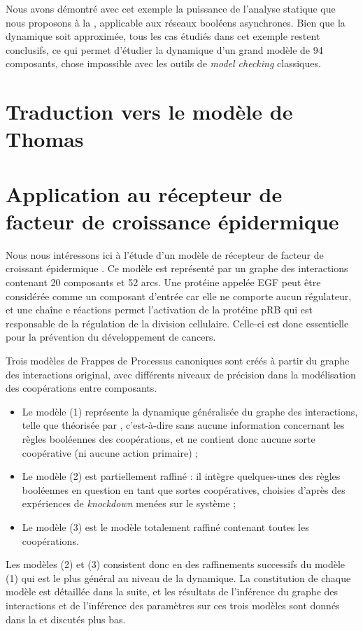 \myskip

Nous avons démontré avec cet exemple la puissance de l'analyse statique que nous proposons
à la , applicable aux réseaux booléens asynchrones.
Bien que la dynamique soit approximée, tous les cas étudiés dans cet exemple restent conclusifs,
ce qui permet d'étudier la dynamique d'un grand modèle de 94 composants,
chose impossible avec les outils de \textit{model checking} classiques.



\section{Traduction vers le modèle de Thomas}


\section{Application au récepteur de facteur de croissance épidermique}

Nous nous intéressons ici à l'étude d'un modèle de récepteur de facteur de croissant épidermique
\cite{Sahin09}.
Ce modèle est représenté par un graphe des interactions contenant 20 composants et 52 arcs.
Une protéine appelée EGF peut être considérée comme un composant d'entrée
car elle ne comporte aucun régulateur,
et une chaîne e réactions permet l'activation de la protéine pRB qui est responsable
de la régulation de la division cellulaire.
Celle-ci est donc essentielle pour la prévention du développement de cancers.

Trois modèles de Frappes de Processus canoniques
sont créés à partir du graphe des interactions original, avec différents niveaux
de précision dans la modélisation des coopérations entre composants.
\begin{itemize}
  \item Le modèle (1) représente la dynamique généralisée du graphe des interactions,
    telle que théorisée par ,
    c'est-à-dire sans aucune information concernant les règles booléennes des coopérations,
    et ne contient donc aucune sorte coopérative (ni aucune action primaire) ;
  \item Le modèle (2) est partiellement raffiné : il intègre quelques-unes des règles
    booléennes en question en tant que sortes coopératives,
    choisies d'après des expériences de \textit{knockdown} menées sur le système ;
  \item Le modèle (3) est le modèle totalement raffiné contenant toutes les coopérations.
\end{itemize}
Les modèles (2) et (3) consistent donc en des raffinements successifs du modèle (1)
qui est le plus général au niveau de la dynamique.
La constitution de chaque modèle est détaillée dans la suite,
et les résultats de l'inférence du graphe des interactions et de l'inférence des paramètres
sur ces trois modèles sont donnés dans la 
et discutés plus bas.

